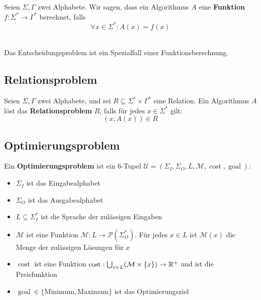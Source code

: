 \begin{definition}
Seien $\Sigma, \Gamma$ zwei Alphabete. Wir sagen, dass ein Algorithmus $A$ eine \textbf{Funktion $f: \Sigma^* \to \Gamma^*$} berechnet, falls
\[
\forall x \in \Sigma^*: A(x) = f(x)
\]\\
\end{definition}

Das Entscheidungsproblem ist ein Spezialfall einer Funktionsberechnung.

\subsection{Relationsproblem}
\begin{definition}
Seien $\Sigma, \Gamma$ zwei Alphabete, und sei $R \subseteq \Sigma^* \times \Gamma^*$ eine Relation. Ein Algorithmus $A$ löst das \textbf{Relationsproblem} $R$, falls für jedes $x \in \Sigma^*$ gilt:
\[
(x, A(x)) \in R
\]
\end{definition}

\subsection{Optimierungsproblem}
Ein \textbf{Optimierungsproblem} ist ein 6-Tupel $\mathcal{U} = (\Sigma_I, \Sigma_O, L, \mathcal{M}, \operatorname{cost}, \operatorname{goal})$:
\begin{itemize}
  \item $\Sigma_I$ ist das Eingabealphabet
  \item $\Sigma_O$ ist das Ausgabealphabet
  \item $L \subseteq \Sigma_I^*$ ist die Sprache der zulässigen Eingaben
  \item $\mathcal{M}$ ist eine Funktion $\mathcal{M}: L \to \mathcal{P}(\Sigma_O^*)$. Für jedes $x \in L$ ist $\mathcal{M}(x)$ die Menge der zulässigen Lösungen für $x$
  \item $\operatorname{cost}$ ist eine Funktion $\operatorname{cost}: \bigcup_{x \in L}(\mathcal{M} \times \{x\}) \to \mathbb{R}^+$ und ist die Preisfunktion
  \item $\operatorname{goal} \in \{\text{Minimum}, \text{Maximum}\}$ ist das Optimierungsziel
\end{itemize}
